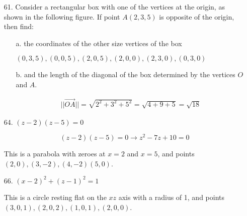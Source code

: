 \documentclass[10pt, letterpaper]{article}
\begin{document}
    \begin{itemize}
        \item [61.] Consider a rectangular box with one of the vertices at the origin, as shown in the following figure. If point $A(2, 3, 5)$ is opposite of the origin, then find:
        
        \begin{mdframed}
            \begin{itemize}
                \item [a.] the coordinates of the other size vertices of the box
                
                $\boxed{
                    (0, 3, 5),
                    (0, 0, 5),
                    (2, 0, 5),
                    (2, 0, 0),
                    (2, 3, 0),
                    (0, 3, 0)
                }$

                \item [b.] and the length of the diagonal of the box determined by the vertices $O$ and $A$.
                
                \begin{equation*}
                    \begin{gathered}
                        ||\vec{OA} || = \sqrt{2^2 + 3^2 + 5^2} = \sqrt{4 + 9 + 5}
                                      = \boxed{\sqrt{18}}
                    \end{gathered}
                \end{equation*}
            \end{itemize}
        \end{mdframed}

        \item [64.] $(z-2)(z-5)=0$
        
        \begin{mdframed}
            \begin{equation*}
                (z-2)(z-5)=0 \rightarrow z^2 - 7z + 10 = 0
            \end{equation*}

            This is a parabola with zeroes at $x=2$ and $x=5$, and points $(2, 0), (3, -2), (4, -2) (5, 0)$.
        \end{mdframed}

        \item [66.] $(x-2)^{2}+(z-1)^{2}=1$
        
        \begin{mdframed}
            This is a circle resting flat on the $xz$ axis with a radius of 1, and points $(3, 0, 1), (2, 0, 2), (1, 0, 1), (2, 0, 0)$.
        \end{mdframed}


\end{itemize}
\end{document}
